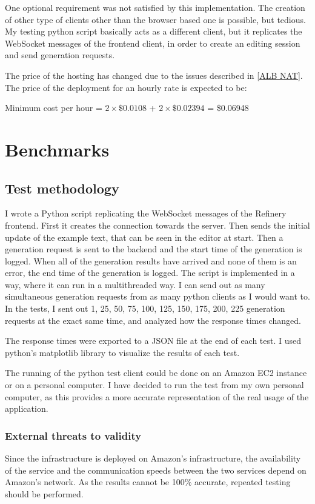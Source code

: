 	One optional requirement was not satisfied by this implementation. The creation of other type of clients other than the browser
	based one is possible, but tedious. My testing python script basically acts as a different client, but it replicates the WebSocket
	messages of the frontend client, in order to create an editing session and send generation requests.

	The price of the hosting has changed due to the issues described in \ref{ALB NAT}. The price of the deployment for an hourly rate 
	is expected to be:

	\begin{center}
		Minimum cost per hour = $2 \times \$0.0108$ + $2 \times \$0.02394$ = \$0.06948
	\end{center}

	\section{Benchmarks} \label{Benchmarks}
		\subsection{Test methodology}
		I wrote a Python script replicating the WebSocket messages of the Refinery frontend. First it creates the connection
		towards the server. Then sends the initial update
		of the example text, that can be seen in the editor at start. Then a generation request is sent to the backend and the start time of the generation
		is logged. When all of the generation results have arrived and none of them is an error, the end time of the generation is logged. 
		The script is implemented in a way, where it can run in a multithreaded way. I can send out as many simultaneous generation requests 
		from as many python clients as I would want to. In the tests, I sent out 1, 25, 50, 75, 100, 125, 150, 175, 200, 225 generation requests
		at the exact same time, and analyzed how the response times changed.

		The response times were exported to a JSON file at the end of each test. I used python's matplotlib library to visualize the results
		of each test.

		The running of the python test client could be done on an Amazon EC2 instance or on a personal computer. I have decided to run the test 
		from my own personal computer, as this provides a more accurate representation of the real usage of the application.

		\subsubsection{External threats to validity}
			Since the infrastructure is deployed on Amazon's infrastructure, the availability of the service and the communication speeds between the two services 
			depend on Amazon's network. As the results cannot be 100\% accurate, repeated testing should be
			performed.

